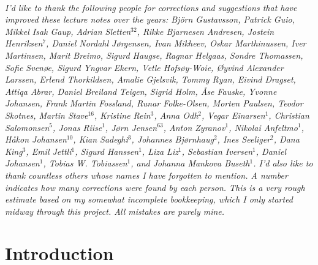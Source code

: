 \documentclass{tufte-book}
\begin{document}
\cleardoublepage
~\vfill
\begin{doublespace}
\noindent\fontsize{10}{10}\selectfont\itshape
\nohyphenation
I'd like to thank the following people for corrections and suggestions
that have improved these lecture notes over the years: Björn
Gustavsson, Patrick Guio,
Mikkel Isak Gaup, Adrian Sletten$^{32}$,
Rikke Bjarnesen Andresen, Jostein Henriksen$^7$, Daniel Nordahl Jørgensen,
Ivan Mikheev, Oskar Marthinussen, Iver Martinsen, Marit Breimo, Sigurd
Haugse, Ragnar Helgaas, Sondre Thomassen, Sofie Svenøe, Sigurd Yngvar
Ekern, Vetle Hofsøy-Woie, Øyvind Alexander Larssen, Erlend
Thorkildsen, Amalie Gjelsvik, Tommy Ryan, Eivind Dragset, Attiqa
Abrar, Daniel Breiland Teigen, Sigrid Holm, Åse Fauske, Yvonne
Johansen, Frank Martin Fossland, Runar Folke-Olsen, Morten Paulsen,
Teodor Skotnes,
Martin Stave$^{16}$, Kristine Rein$^{3}$, Anna Odh$^{2}$, Vegar
Einarsen$^{1}$, Christian Salomonsen$^{5}$, Jonas Riise$^{1}$, Jørn
Jensen$^{63}$, Anton Zyranov$^{1}$, Nikolai Anfeltmo$^{1}$, Håkon
Johansen$^{10}$, Kian Sadeghi$^{3}$, Johannes Bjørnhaug$^{2}$, Ines
Seeliger$^{2}$, Dana King$^{3}$, Emil Jettli$^{1}$, Sigurd
Hanssen$^{1}$, Liza Liz$^{1}$, Sebastian Iversen$^{1}$, Daniel
Johansen$^{1}$, Tobias W. Tobiassen$^{1}$, and Johanna Mankova
Buseth$^{1}$. I'd also like to thank countless others whose names I
have forgotten to mention. A number indicates how many corrections were
found by each person. This is a very rough estimate based on my
somewhat incomplete bookkeeping, which I only started midway through
this project. All mistakes are purely mine.
\end{doublespace}
\vfill
\vfill





\cleardoublepage


\ifSpIntro
\chapter{Introduction}

\fi

\ifSpPython
\end{document}

